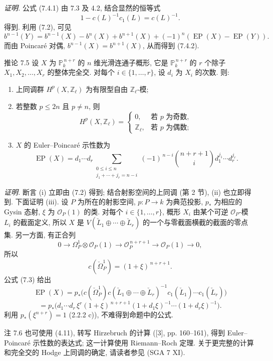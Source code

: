 \emph{证明.} 公式 (7.4.1) 由 7.3 及 4.2, 结合显然的恒等式
\[
1-c(L)^{-1}c_1(L)=c(L)^{-1}.
\]
得到. 利用 (7.2), 可见
\[
b^{n-1}(Y)=b^{n-1}(X)-b^n(X)+b^{n+1}(X)+(-1)^n(\operatorname{EP}(X)-\operatorname{EP}(Y)).
\]
而由 Poincaré 对偶, $b^{n-1}(X)=b^{n+1}(X)$, 从而得到 (7.4.2).

\begin{statement}{推论 7.5}
设 $X$ 为 $\mathbb P_k^{\,n+r}$ 的 $n$ 维光滑连通子概形, 它是 $\mathbb P_k^{\,n+r}$ 的 $r$ 个除子 $X_1,X_2,\ldots,X_r$ 的整体完全交. 对每个 $i\in\{1,\ldots,r\}$, 设 $d_i$ 为 $X_i$ 的次数. 则:
\begin{enumerate}[label=(\roman*)]
\item 上同调群 $H^p(X,\mathbb Z_\ell)$ 为有限型自由 $\mathbb Z_\ell$-模;
\item 若整数 $p\le 2n$ 且 $p\ne n$, 则
\[
H^p(X,\mathbb Z_\ell)=
\begin{cases}
0,&\text{若 }p\text{ 为奇数},\\
\mathbb Z_\ell,&\text{若 }p\text{ 为偶数};
\end{cases}
\]
\item $X$ 的 Euler--Poincaré 示性数为
\[
\operatorname{EP}(X)
=d_1\cdots d_r
\sum_{\substack{0\le i\le n\\ j_1+\cdots+j_r=n-i}}
(-1)^{\,n-i}\binom{n+r+1}{i}
d_1^{j_1}\cdots d_r^{j_r}.
\]
\end{enumerate}
\end{statement}

\emph{证明.} 断言 (i) 立即由 (7.2) 得到; 结合射影空间的上同调 (第 2 节), (ii) 也立即得到. 下面证明 (iii). 设 $P$ 为所在的射影空间, $p:P\to k$ 为典范投影, $p_*$ 为相应的 Gysin 态射, $\xi$ 为 $\mathcal O_P(1)$ 的类. 对每个 $i\in\{1,\ldots,r\}$, 概形 $X_i$ 由某个可逆 $\mathcal O_P$-模 $L_i$ 的截面定义, 所以 $X$ 是 $V(\check L_1\oplus\cdots\oplus\check L_r)$ 的一个与零截面横截的截面的零点集. 另一方面, 有正合列
\[
0\to\Omega_P^1\otimes\mathcal O_P(1)\to\mathcal O_P^{\,n+r+1}\to\mathcal O_P(1)\to0,
\]
所以
\[
c(\check\Omega_P^1)=(1+\xi)^{\,n+r+1}.
\]
公式 (7.3) 给出
\[
\operatorname{EP}(X)
=p_*\bigl(c(\check\Omega_P^1)c(\check L_1\oplus\cdots\oplus\check L_r)^{-1}
c_1(\check L_1)\cdots c_1(\check L_r)\bigr)
\]
\[
=p_*\bigl(d_1\cdots d_r\,\xi^r(1+\xi)^{\,n+r+1}
(1+d_1\xi)^{-1}\cdots(1+d_r\xi)^{-1}\bigr).
\]
利用 $p_*(\xi^{n+r})=1$ (2.2.2 c)), 不难得到命题中的公式.

\begin{statement}{注 7.6}
也可使用 (4.11), 转写 Hirzebruch 的计算 ([3], pp. 160--161), 得到 Euler--Poincaré 示性数的表达式; 这一计算使用 Riemann--Roch 定理. 关于更完整的计算和完全交的 Hodge 上同调的确定, 请读者参见 (SGA 7 XI).
\end{statement}

